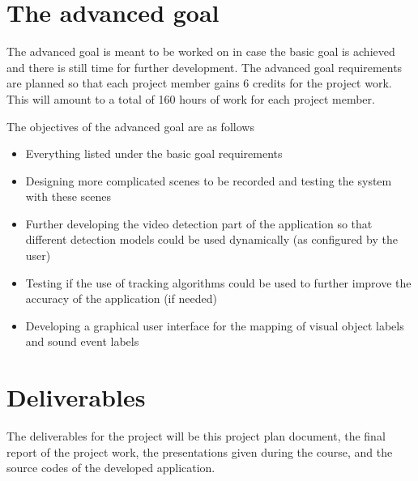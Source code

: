 \section{The advanced goal}

The advanced goal is meant to be worked on in case the basic goal is achieved and there is still time for further development. The advanced goal requirements are planned so that each project member gains 6 credits for the project work. This will amount to a total of 160 hours of work for each project member. 

The objectives of the advanced goal are as follows

\begin{itemize}
	\item Everything listed under the basic goal requirements
	\item Designing more complicated scenes to be recorded and testing the system with these scenes
	\item Further developing the video detection part of the application so that different detection models could be used dynamically (as configured by the user)
	\item Testing if the use of tracking algorithms could be used to further improve the accuracy of the application (if needed)
	\item Developing a graphical user interface for the mapping of visual object labels and sound event labels
\end{itemize} 

\section{Deliverables}

The deliverables for the project will be this project plan document, the final report of the project work, the presentations given during the course, and the source codes of the developed application. 